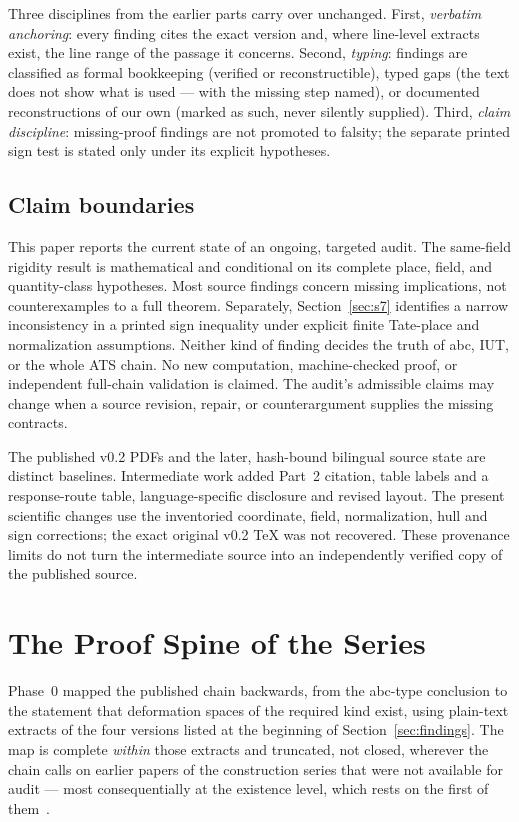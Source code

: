 \documentclass[11pt,a4paper]{article}
\theoremstyle{definition}
\theoremstyle{remark}
\begin{document}
Three disciplines from the earlier parts carry over unchanged. First,
\emph{verbatim anchoring}: every finding cites the exact version and, where
line-level extracts exist, the line range of the passage it concerns.
Second, \emph{typing}: findings are classified as formal bookkeeping
(verified or reconstructible), typed gaps (the text does not show what is
used --- with the missing step named), or documented reconstructions of our
own (marked as such, never silently supplied). Third, \emph{claim
discipline}: missing-proof findings are not promoted to falsity; the separate printed
sign test is stated only under its explicit hypotheses.

\subsection{Claim boundaries}\label{sec:claims-intro}

This paper reports the current state of an ongoing, targeted audit. The
same-field rigidity result is mathematical and conditional on its complete
place, field, and quantity-class hypotheses. Most source findings concern
missing implications, not counterexamples to a full theorem. Separately,
Section~\ref{sec:s7} identifies a narrow inconsistency in a printed sign
inequality under explicit finite Tate-place and normalization assumptions.
Neither kind of finding decides the truth of abc, IUT, or the whole ATS
chain. No new computation, machine-checked proof, or independent full-chain
validation is claimed. The audit's admissible claims may change when a
source revision, repair, or counterargument supplies the missing contracts.

The published v0.2 PDFs and the later, hash-bound bilingual source state are
distinct baselines. Intermediate work added Part~2 citation, table labels
and a response-route table, language-specific disclosure and revised layout.
The present scientific changes use the inventoried coordinate, field,
normalization, hull and sign corrections; the exact original v0.2 TeX was
not recovered. These provenance limits do not turn the intermediate source
into an independently verified copy of the published source.

\section{The Proof Spine of the Series}\label{sec:spine}

Phase~0 mapped the published chain backwards, from the abc-type conclusion to the
statement that deformation spaces of the required kind exist, using plain-text
extracts of the four versions listed at the beginning of
Section~\ref{sec:findings}. The map is complete \emph{within} those extracts and
truncated, not closed, wherever the chain calls on earlier papers of the
construction series that were not available for audit --- most consequentially at
the existence level, which rests on the first of them~\cite{joshiI}.
\end{document}
